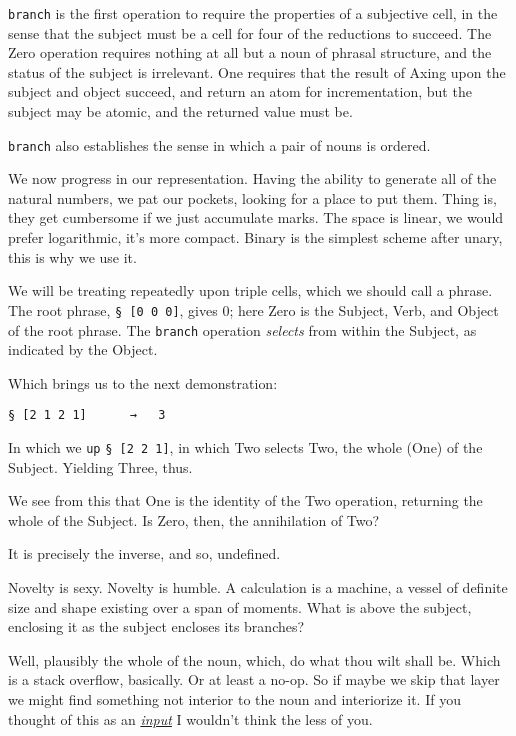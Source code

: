 \documentclass[twoside]{article}
\begin{document}
\texttt{branch} is the first operation to require the properties of a subjective cell, in the sense that the subject must be a cell for four of the reductions to succeed. The Zero operation requires nothing at all but a noun of phrasal structure, and the status of the subject is irrelevant. One requires that the result of Axing upon the subject and object succeed, and return an atom for incrementation, but the subject may be atomic, and the returned value must be.

\texttt{branch} also establishes the sense in which a pair of nouns is ordered.

We now progress in our representation. Having the ability to generate all of the natural numbers, we pat our pockets, looking for a place to put them. Thing is, they get cumbersome if we just accumulate marks. The space is linear, we would prefer logarithmic, it's more compact. Binary is the simplest scheme after unary, this is why we use it.

We will be treating repeatedly upon triple cells, which we should call a phrase. The root phrase, \lstinline[style=inlinecode]{§ [0 0 0]}, gives 0; here Zero is the Subject, Verb, and Object of the root phrase. The \texttt{branch} operation \emph{selects} from within the Subject, as indicated by the Object.

Which brings us to the next demonstration:

\begin{lstlisting}[style=listingblock]
§ [2 1 2 1]      →   3
\end{lstlisting}

In which we \texttt{up} \lstinline[style=inlinecode]{§ [2 2 1]}, in which Two selects Two, the whole (One) of the Subject. Yielding Three, thus.

We see from this that One is the identity of the Two operation, returning the whole of the Subject. Is Zero, then, the annihilation of Two?

It is precisely the inverse, and so, undefined.

Novelty is sexy. Novelty is humble. A calculation is a machine, a vessel of definite size and shape existing over a span of moments. What is above the subject, enclosing it as the subject encloses its branches?

Well, plausibly the whole of the noun, which, do what thou wilt shall be. Which is a stack overflow, basically. Or at least a no-op. So if maybe we skip that layer we might find something not interior to the noun and interiorize it. If you thought of this as an \href{https://en.wikipedia.org/wiki/Pseudopodia}{\emph{input}} I wouldn't think the less of you.
\end{document}
